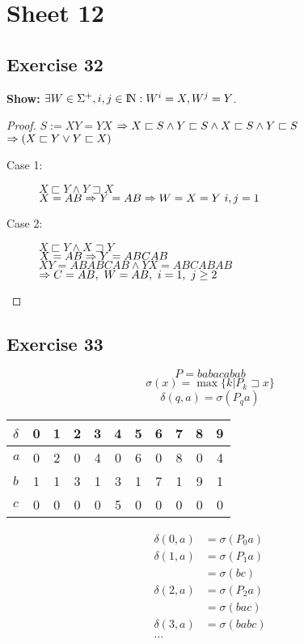 \documentclass[12pt,oneside,a4paper,parskip=on,fleqn]{scrartcl}
\begin{document}
\section*{Sheet 12}
\subsection*{Exercise 32}
\textbf{Show:} $\exists W\in \Sigma^+, i,j\in \N: W^i=X, W^j=Y$.
\begin{proof}
$S:= XY=YX$
$\Rightarrow X \sqsubset S \wedge Y\sqsubset S \wedge X \sqsubset S \wedge Y \sqsubset S$\\
$\Rightarrow (X\sqsubset Y \vee Y\sqsubset X)$\\
\begin{description}
	\item[Case 1: ] $X\sqsubset Y \wedge Y\sqsupset X$\\
		$X=AB\Ra Y=AB \Ra W = X = Y \ i,j=1$
	\item[Case 2: ] $X\sqsubset Y \wedge X\sqsupset Y$\\
		$X=AB\Rightarrow Y=ABCAB$\\
		$XY=ABABCAB \wedge YX=ABCABAB$\\
		$\Rightarrow C=AB,\ W=AB,\ i=1,\ j\geq 2$

\end{description}
\end{proof}


\subsection*{Exercise 33}
\[
	P=babacabab
\]\[
	\sigma(x) = \max\bigl\{ k | P_k \sqsupset x \bigr\}
\]\[
	\delta(q,a) = \sigma(P_qa)
\]


\begin{center}
\begin{tabular}{|l||c|c|c|c|c|c|c|c|c|c|}
	\hline
	$\delta$ & 0 & 1 & 2 & 3 & 4 & 5 & 6 & 7 & 8 & 9 \\\hline\hline
	$a$ & 0 & 2 & 0 & 4 & 0 & 6 & 0 & 8 & 0 & 4\\\hline
	$b$ & 1 & 1 & 3 & 1 & 3 & 1 & 7 & 1 & 9 & 1\\\hline
	$c$ & 0 & 0 & 0 & 0 & 5 & 0 & 0 & 0 & 0 & 0\\\hline
\end{tabular}
\end{center}
\begin{align*}
	\delta(0,a) &= \sigma(P_0a)\\
	\delta(1,a) &= \sigma(P_1a)\\
				&= \sigma(bc)\\
	\delta(2,a) &= \sigma(P_2 a)\\
				&= \sigma(bac)\\
	\delta(3,a) &= \sigma(babc)\\
	\ldots
\end{align*}
\end{document}
